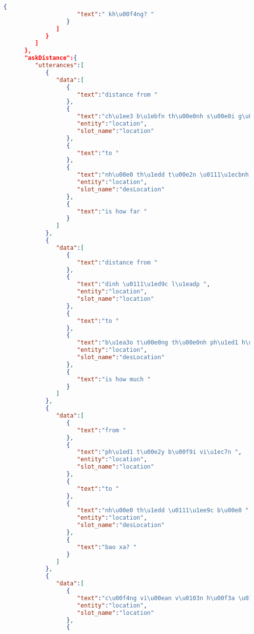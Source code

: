 \begin{lstlisting}[language=json,firstnumber=1]
                  {
                     "text":" kh\u00f4ng? "
                  }
               ]
            }
         ]
      },
      "askDistance":{
         "utterances":[
            {
               "data":[
                  {
                     "text":"distance from "
                  },
                  {
                     "text":"ch\u1ee3 b\u1ebfn th\u00e0nh s\u00e0i g\u00f2n ",
                     "entity":"location",
                     "slot_name":"location"
                  },
                  {
                     "text":"to "
                  },
                  {
                     "text":"nh\u00e0 th\u1edd t\u00e2n \u0111\u1ecbnh ",
                     "entity":"location",
                     "slot_name":"desLocation"
                  },
                  {
                     "text":"is how far "
                  }
               ]
            },
            {
               "data":[
                  {
                     "text":"distance from "
                  },
                  {
                     "text":"dinh \u0111\u1ed9c l\u1eadp ",
                     "entity":"location",
                     "slot_name":"location"
                  },
                  {
                     "text":"to "
                  },
                  {
                     "text":"b\u1ea3o t\u00e0ng th\u00e0nh ph\u1ed1 h\u1ed3 ch\u00ed minh ",
                     "entity":"location",
                     "slot_name":"desLocation"
                  },
                  {
                     "text":"is how much "
                  }
               ]
            },
            {
               "data":[
                  {
                     "text":"from "
                  },
                  {
                     "text":"ph\u1ed1 t\u00e2y b\u00f9i vi\u1ec7n ",
                     "entity":"location",
                     "slot_name":"location"
                  },
                  {
                     "text":"to "
                  },
                  {
                     "text":"nh\u00e0 th\u1edd \u0111\u1ee9c b\u00e0 ",
                     "entity":"location",
                     "slot_name":"desLocation"
                  },
                  {
                     "text":"bao xa? "
                  }
               ]
            },
            {
               "data":[
                  {
                     "text":"c\u00f4ng vi\u00ean v\u0103n h\u00f3a \u0111\u1ea7m sen ",
                     "entity":"location",
                     "slot_name":"location"
                  },
                  {

\end{lstlisting}
